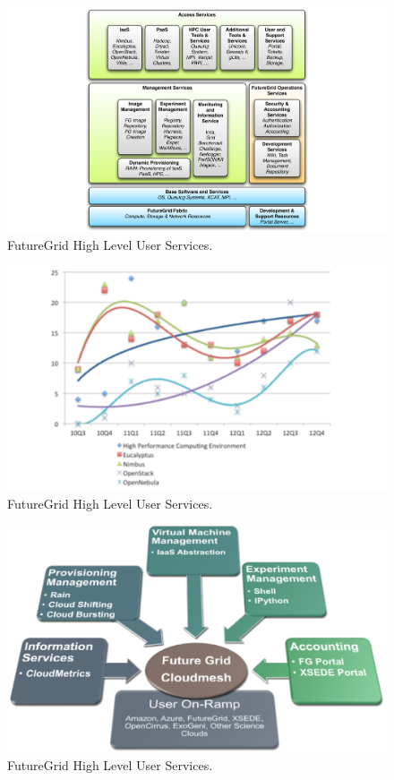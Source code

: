 \documentclass{article}
\begin{document}
\begin{figure}[h!]
  \caption{FutureGrid High Level User Services.}
  \centering
    \includegraphics[width=1.0\textwidth]{images/architecture}
\end{figure}

\begin{figure}[h!]
  \caption{FutureGrid High Level User Services.}
  \centering
    \includegraphics[width=1.0\textwidth]{images/trend}
\end{figure}

\begin{figure}[h!]
  \caption{FutureGrid High Level User Services.}
  \centering
    \includegraphics[width=1.0\textwidth]{images/cm-functionality}
\end{figure}
\end{document}
